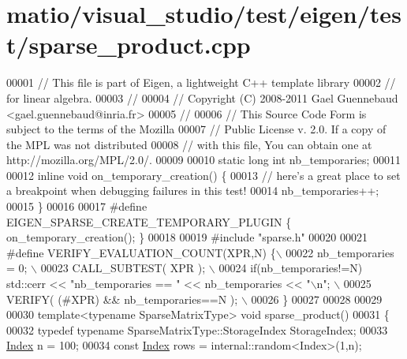 \hypertarget{matio_2visual__studio_2test_2eigen_2test_2sparse__product_8cpp_source}{}\section{matio/visual\+\_\+studio/test/eigen/test/sparse\+\_\+product.cpp}
\label{matio_2visual__studio_2test_2eigen_2test_2sparse__product_8cpp_source}

\begin{DoxyCode}
00001 \textcolor{comment}{// This file is part of Eigen, a lightweight C++ template library}
00002 \textcolor{comment}{// for linear algebra.}
00003 \textcolor{comment}{//}
00004 \textcolor{comment}{// Copyright (C) 2008-2011 Gael Guennebaud <gael.guennebaud@inria.fr>}
00005 \textcolor{comment}{//}
00006 \textcolor{comment}{// This Source Code Form is subject to the terms of the Mozilla}
00007 \textcolor{comment}{// Public License v. 2.0. If a copy of the MPL was not distributed}
00008 \textcolor{comment}{// with this file, You can obtain one at http://mozilla.org/MPL/2.0/.}
00009 
00010 \textcolor{keyword}{static} \textcolor{keywordtype}{long} \textcolor{keywordtype}{int} nb\_temporaries;
00011 
00012 \textcolor{keyword}{inline} \textcolor{keywordtype}{void} on\_temporary\_creation() \{
00013   \textcolor{comment}{// here's a great place to set a breakpoint when debugging failures in this test!}
00014   nb\_temporaries++;
00015 \}
00016 
00017 \textcolor{preprocessor}{#define EIGEN\_SPARSE\_CREATE\_TEMPORARY\_PLUGIN \{ on\_temporary\_creation(); \}}
00018 
00019 \textcolor{preprocessor}{#include "sparse.h"}
00020 
00021 \textcolor{preprocessor}{#define VERIFY\_EVALUATION\_COUNT(XPR,N) \{\(\backslash\)}
00022 \textcolor{preprocessor}{    nb\_temporaries = 0; \(\backslash\)}
00023 \textcolor{preprocessor}{    CALL\_SUBTEST( XPR ); \(\backslash\)}
00024 \textcolor{preprocessor}{    if(nb\_temporaries!=N) std::cerr << "nb\_temporaries == " << nb\_temporaries << "\(\backslash\)n"; \(\backslash\)}
00025 \textcolor{preprocessor}{    VERIFY( (#XPR) && nb\_temporaries==N ); \(\backslash\)}
00026 \textcolor{preprocessor}{  \}}
00027 
00028 
00029 
00030 \textcolor{keyword}{template}<\textcolor{keyword}{typename} SparseMatrixType> \textcolor{keywordtype}{void} sparse\_product()
00031 \{
00032   \textcolor{keyword}{typedef} \textcolor{keyword}{typename} SparseMatrixType::StorageIndex StorageIndex;
00033   \hyperlink{namespace_eigen_a62e77e0933482dafde8fe197d9a2cfde}{Index} n = 100;
00034   \textcolor{keyword}{const} \hyperlink{namespace_eigen_a62e77e0933482dafde8fe197d9a2cfde}{Index} rows  = internal::random<Index>(1,n);

\end{DoxyCode}
